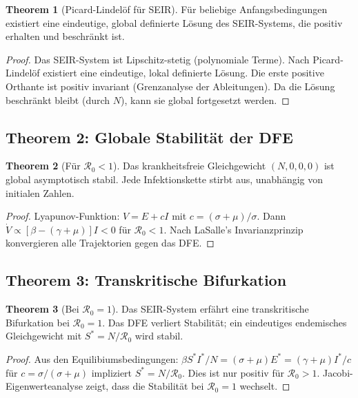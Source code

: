 ﻿\documentclass[a4paper,12pt,twoside]{article}
\theoremstyle{definition}
\newtheorem{theorem}{Theorem}[section]
\begin{document}
\begin{theorem}[Picard-Lindelöf für SEIR]
Für beliebige Anfangsbedingungen existiert eine eindeutige, global definierte Lösung des SEIR-Systems, die positiv erhalten und beschränkt ist.
\end{theorem}

\begin{proof}
Das SEIR-System ist Lipschitz-stetig (polynomiale Terme). Nach Picard-Lindelöf existiert eine eindeutige, lokal definierte Lösung. Die erste positive Orthante ist positiv invariant (Grenzanalyse der Ableitungen). Da die Lösung beschränkt bleibt (durch $N$), kann sie global fortgesetzt werden.
\end{proof}

\subsection{Theorem 2: Globale Stabilität der DFE}

\begin{theorem}[Für $\mathcal{R}_0 < 1$]
Das krankheitsfreie Gleichgewicht $(N, 0, 0, 0)$ ist global asymptotisch stabil. Jede Infektionskette stirbt aus, unabhängig von initialen Zahlen.
\end{theorem}

\begin{proof}
Lyapunov-Funktion: $V = E + c I$ mit $c = (\sigma + \mu) / \sigma$. Dann $\dot{V} \propto [\beta - (\gamma + \mu)] I < 0$ für $\mathcal{R}_0 < 1$. Nach LaSalle's Invarianzprinzip konvergieren alle Trajektorien gegen das DFE.
\end{proof}

\subsection{Theorem 3: Transkritische Bifurkation}

\begin{theorem}[Bei $\mathcal{R}_0 = 1$]
Das SEIR-System erfährt eine transkritische Bifurkation bei $\mathcal{R}_0 = 1$. Das DFE verliert Stabilität; ein eindeutiges endemisches Gleichgewicht mit $S^* = N / \mathcal{R}_0$ wird stabil.
\end{theorem}

\begin{proof}
Aus den Equilibiumsbedingungen: $\beta S^* I^* / N = (\sigma + \mu) E^* = (\gamma + \mu) I^* / c$ für $c = \sigma / (\sigma + \mu)$ impliziert $S^* = N / \mathcal{R}_0$. Dies ist nur positiv für $\mathcal{R}_0 > 1$. Jacobi-Eigenwerteanalyse zeigt, dass die Stabilität bei $\mathcal{R}_0 = 1$ wechselt.
\end{proof}
\end{document}
